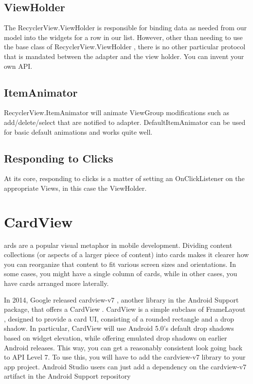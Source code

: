 \subsection{ViewHolder}
The RecyclerView.ViewHolder is responsible for binding data as needed from our
model into the widgets for a row in our list. However, other than needing to use the base class of RecyclerView.ViewHolder ,
there is no other particular protocol that is mandated between the adapter and the
view holder. You can invent your own API.

\subsection{ItemAnimator}
RecyclerView.ItemAnimator will animate ViewGroup modifications such as add/delete/select that are notified to adapter. DefaultItemAnimator can be used for basic default animations and works quite well.


\subsection{Responding to Clicks}
At its core, responding to clicks is a matter of setting an OnClickListener on the
appropriate Views, in this case the ViewHolder. 




\section{CardView}
ards are a popular visual metaphor in mobile development. Dividing content
collections (or aspects of a larger piece of content) into cards makes it clearer how you can reorganize that content to fit various screen sizes and orientations. In some
cases, you might have a single column of cards, while in other cases, you have cards
arranged more laterally.

In 2014, Google released cardview-v7 , another library in the Android Support
package, that offers a CardView . CardView is a simple subclass of FrameLayout ,
designed to provide a card UI, consisting of a rounded rectangle and a drop shadow.
In particular, CardView will use Android 5.0’s default drop shadows based on widget
elevation, while offering emulated drop shadows on earlier Android releases. This
way, you can get a reasonably consistent look going back to API Level 7.
To use this, you will have to add the cardview-v7 library to your app project.
Android Studio users can just add a dependency on the cardview-v7 artifact in the
Android Support repository
